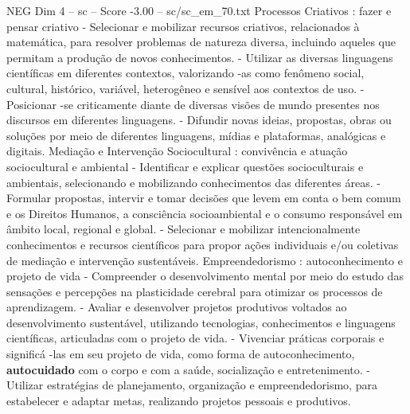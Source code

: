 \begin{textsample}{NEG Dim 4 – sc – Score -3.00 – sc/sc\_em\_70.txt}
Processos Criativos : fazer e pensar criativo - Selecionar e mobilizar recursos criativos, relacionados à matemática, para resolver problemas de natureza diversa, incluindo aqueles que permitam a produção de novos conhecimentos. - Utilizar as diversas linguagens científicas em diferentes contextos, valorizando -as como fenômeno social, cultural, histórico, variável, heterogêneo e sensível aos contextos de uso. - Posicionar -se criticamente diante de diversas visões de mundo presentes nos discursos em diferentes linguagens. - Difundir novas ideias, propostas, obras ou soluções por meio de diferentes linguagens, mídias e plataformas, analógicas e digitais.
Mediação e Intervenção Sociocultural : convivência e atuação sociocultural e ambiental - Identificar e explicar questões socioculturais e ambientais, selecionando e mobilizando conhecimentos das diferentes áreas. - Formular propostas, intervir e tomar decisões que levem em conta o bem comum e os Direitos Humanos, a consciência socioambiental e o consumo responsável em âmbito local, regional e global. - Selecionar e mobilizar intencionalmente conhecimentos e recursos científicos para propor ações individuais e/ou coletivas de mediação e intervenção sustentáveis.
Empreendedorismo : autoconhecimento e projeto de vida - Compreender o desenvolvimento mental por meio do estudo das sensações e percepções na plasticidade cerebral para otimizar os processos de aprendizagem. - Avaliar e desenvolver projetos produtivos voltados ao desenvolvimento sustentável, utilizando tecnologias, conhecimentos e linguagens científicas, articuladas com o projeto de vida. - Vivenciar práticas corporais e significá -las em seu projeto de vida, como forma de autoconhecimento, \textbf{autocuidado} com o corpo e com a saúde, socialização e entretenimento. - Utilizar estratégias de planejamento, organização e empreendedorismo, para estabelecer e adaptar metas, realizando projetos pessoais e produtivos.

\end{textsample}
